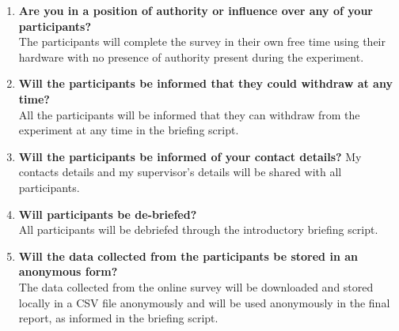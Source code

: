 \begin{enumerate}
    \item \textbf{Are you in a position of authority or influence over any of your     participants?}\\
    The participants will complete the survey in their own free time using their hardware with no presence of authority present during the experiment.
    \item \textbf{Will the participants be informed that they could withdraw at any time?}\\
    All the participants will be informed that they can withdraw from the experiment at any time in the briefing script.
    \item \textbf{Will the participants be informed of your contact details?}
    My contacts details and my supervisor's details will be shared with all participants.
    \item \textbf{Will participants be de-briefed?}\\
    All participants will be debriefed through the introductory briefing script.
    \item \textbf{Will the data collected from the participants be stored in an anonymous form?}\\
    The data collected from the online survey will be downloaded and stored locally in a CSV file anonymously and will be used anonymously in the final report, as informed in the briefing script.
\end{enumerate}
